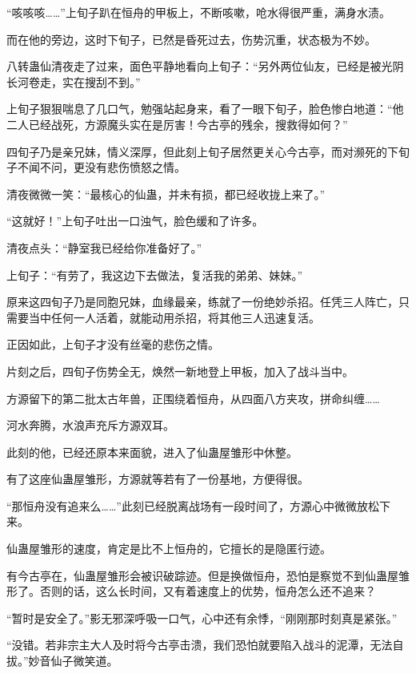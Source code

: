 
\begin{this_body}

“咳咳咳……”上旬子趴在恒舟的甲板上，不断咳嗽，呛水得很严重，满身水渍。

而在他的旁边，这时下旬子，已然是昏死过去，伤势沉重，状态极为不妙。

八转蛊仙清夜走了过来，面色平静地看向上旬子：“另外两位仙友，已经是被光阴长河卷走，实在搜刮不到。”

上旬子狠狠喘息了几口气，勉强站起身来，看了一眼下旬子，脸色惨白地道：“他二人已经战死，方源魔头实在是厉害！今古亭的残余，搜救得如何？”

四旬子乃是亲兄妹，情义深厚，但此刻上旬子居然更关心今古亭，而对濒死的下旬子不闻不问，更没有悲伤愤怒之情。

清夜微微一笑：“最核心的仙蛊，并未有损，都已经收拢上来了。”

“这就好！”上旬子吐出一口浊气，脸色缓和了许多。

清夜点头：“静室我已经给你准备好了。”

上旬子：“有劳了，我这边下去做法，复活我的弟弟、妹妹。”

原来这四旬子乃是同胞兄妹，血缘最亲，练就了一份绝妙杀招。任凭三人阵亡，只需要当中任何一人活着，就能动用杀招，将其他三人迅速复活。

正因如此，上旬子才没有丝毫的悲伤之情。

片刻之后，四旬子伤势全无，焕然一新地登上甲板，加入了战斗当中。

方源留下的第二批太古年兽，正围绕着恒舟，从四面八方夹攻，拼命纠缠……

河水奔腾，水浪声充斥方源双耳。

此刻的他，已经还原本来面貌，进入了仙蛊屋雏形中休整。

有了这座仙蛊屋雏形，方源就等若有了一份基地，方便得很。

“那恒舟没有追来么……”此刻已经脱离战场有一段时间了，方源心中微微放松下来。

仙蛊屋雏形的速度，肯定是比不上恒舟的，它擅长的是隐匿行迹。

有今古亭在，仙蛊屋雏形会被识破踪迹。但是换做恒舟，恐怕是察觉不到仙蛊屋雏形了。否则的话，这么长时间，又有着速度上的优势，恒舟怎么还不追来？

“暂时是安全了。”影无邪深呼吸一口气，心中还有余悸，“刚刚那时刻真是紧张。”

“没错。若非宗主大人及时将今古亭击溃，我们恐怕就要陷入战斗的泥潭，无法自拔。”妙音仙子微笑道。


\end{this_body}
